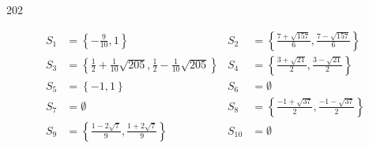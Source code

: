


  \begin{corrige}{202}

\begin{align*}
S_{1}&=\left\{-\frac{9}{10},1\right\}&S_{2}&=\left\{\frac{7+\sqrt{157}}{6},\frac{7-\sqrt{157}}{6}\right\}\\
S_{3}&=\left\{\frac{1}{2}+\frac{1}{10}\sqrt{205},\frac{1}{2}-\frac{1}{10}\sqrt{205}\right\}&S_{4}&=\left\{\frac{3+\sqrt{21}}{2},\frac{3-\sqrt{21}}{2}\right\}\\
S_{5}&=\left\{-1,1\right\}&S_{6}&=\emptyset\\
S_{7}&=\emptyset&S_{8}&=\left\{\frac{-1+\sqrt{37}}{2},\frac{-1-\sqrt{37}}{2}\right\}\\
S_{9}&=\left\{\frac{1-2\sqrt{7}}{9},\frac{1+2\sqrt{7}}{9}\right\}&S_{10}&=\emptyset
\end{align*}
 \end{corrige}